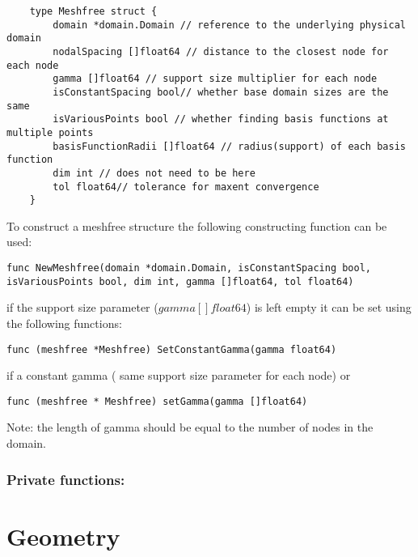 \begin{tcolorbox}
	\begin{lstlisting}
	type Meshfree struct {	
		domain *domain.Domain // reference to the underlying physical domain
		nodalSpacing []float64 // distance to the closest node for each node 
		gamma []float64 // support size multiplier for each node
		isConstantSpacing bool// whether base domain sizes are the same
		isVariousPoints bool // whether finding basis functions at multiple points
		basisFunctionRadii []float64 // radius(support) of each basis function
		dim int // does not need to be here
		tol float64// tolerance for maxent convergence
	}
	\end{lstlisting}
\end{tcolorbox}
\noindent To construct a meshfree structure the following constructing function can be used:
\begin{lstlisting}
func NewMeshfree(domain *domain.Domain, isConstantSpacing bool, isVariousPoints bool, dim int, gamma []float64, tol float64)
\end{lstlisting}
if the support size parameter ($gamma []float64$) is left empty it can be set using the following functions:
\begin{lstlisting}
func (meshfree *Meshfree) SetConstantGamma(gamma float64)
\end{lstlisting}
if a constant gamma ( same support size parameter for each node)
or 
\begin{lstlisting}
func (meshfree * Meshfree) setGamma(gamma []float64)
\end{lstlisting}
Note: the length of gamma should be equal to the number of nodes in the domain. 


\subsubsection*{Private functions:}
\section{Geometry}

